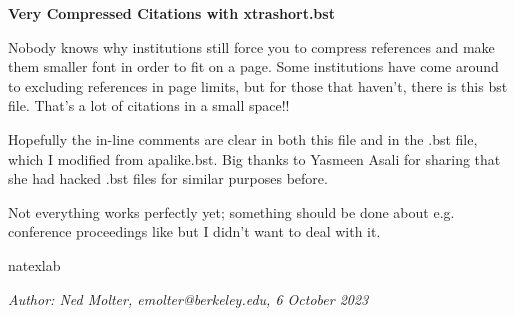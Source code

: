 \documentclass[11pt]{article}
\begin{document}
\begin{center}
	\textbf{Very Compressed Citations with xtrashort.bst}
\end{center}

\justification

Nobody knows why institutions still force you to compress references and make them smaller font in order to fit on a page. Some institutions have come around to excluding references in page limits, but for those that haven't, there is this bst file. That's a lot of citations in a small space!\citep{akins23, allison91, arras21, atreya20, aurnou07, beebe05, brogan18, lellouch07, sherjal95,  esposito91, teca}!

Hopefully the in-line comments are clear in both this file and in the .bst file, which I modified from apalike.bst. Big thanks to Yasmeen Asali for sharing that she had hacked .bst files for similar purposes before.

Not everything works perfectly yet; something should be done about e.g. conference proceedings like \citep{thatte15} but I didn't want to deal with it.

\expandafter\ifx\csname natexlab\endcsname\relax\def\natexlab#1{#1}\fi


\vspace{2cm}
\noindent\textit{
Author: Ned Molter, emolter@berkeley.edu, 6 October 2023
}
\end{document}
